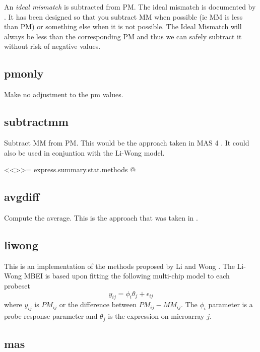 An \emph{ideal mismatch} is subtracted from PM. The ideal mismatch is documented by \cite{affy:tech:2002}. It has been designed so that you subtract MM when possible (ie MM is less than PM) or something else when it is not possible. The Ideal Mismatch will always be less than the corresponding PM and thus we can safely subtract it without risk of negative values.

\subsection{pmonly}

Make no adjustment to the pm values.

\subsection{subtractmm}

Subtract MM from PM. This would be the approach taken in MAS 4 \cite{affy4}. It could also be used in conjuntion with the Li-Wong model.

<<>>=
express.summary.stat.methods
@

\subsection{avgdiff}

Compute the average. This is the approach that was taken in \cite{affy4}.

\subsection{liwong}

This is an implementation of the methods proposed by Li and Wong \cite{PMID_11134512,PMID_11532216}. The Li-Wong MBEI is based upon fitting the following multi-chip model to each probeset
\begin{equation}
y_{ij} = \phi_i \theta_j + \epsilon_{ij}
\end{equation}
where $y_{ij}$ is $PM_{ij}$ or the difference between $PM_{ij}-MM_{ij}$. The $\phi_i$ parameter is a probe response parameter and $\theta_j$ is the expression on microarray $j$.


\subsection{mas}


